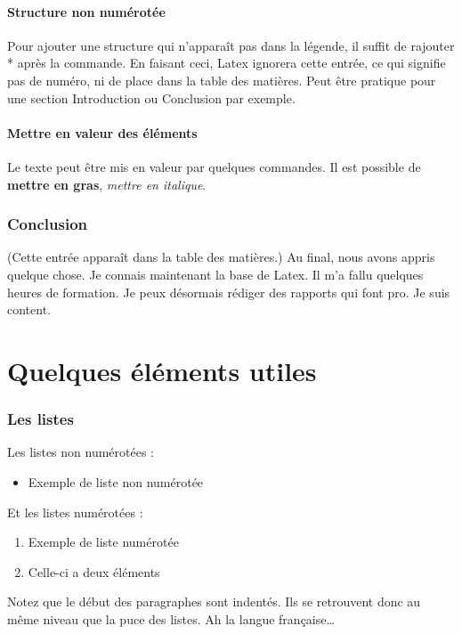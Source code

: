 \subsection*{Structure non numérotée}
Pour ajouter une structure qui n'apparaît pas dans la légende, il suffit de rajouter * après la commande. En faisant ceci, Latex ignorera cette entrée, ce qui signifie pas de numéro, ni de place dans la table des matières. Peut être pratique pour une section Introduction ou Conclusion par exemple.

\subsection{Mettre en valeur des éléments}
Le texte peut être mis en valeur par quelques commandes. Il est possible de \textbf{mettre en gras}, \emph{mettre en italique}.

\section*{Conclusion}
(Cette entrée apparaît dans la table des matières.)
Au final, nous avons appris quelque chose. Je connais maintenant la base de Latex. Il m'a fallu quelques heures de formation. Je peux désormais rédiger des rapports qui font pro. Je suis content.

\part{Quelques éléments utiles}
\section{Les listes}
Les listes non numérotées : 
\begin{itemize}
	\item Exemple de liste non numérotée
\end{itemize}

Et les listes numérotées : 
\begin{enumerate}
	\item Exemple de liste numérotée
	\item Celle-ci a deux éléments
\end{enumerate}
Notez que le début des paragraphes sont indentés. Ils se retrouvent donc au même \og{}niveau\fg{} que la puce des listes. Ah la langue française\dots
